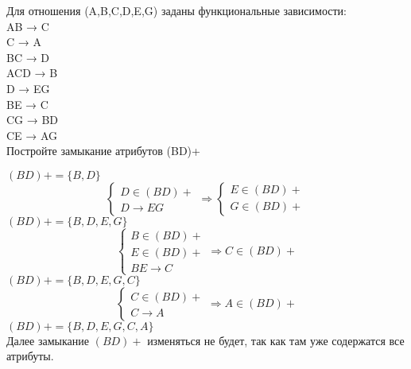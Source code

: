\begin{problem}
Для отношения (A,B,C,D,E,G) заданы функциональные зависимости: \\
AB → C \\
C → A \\
BC → D \\
ACD → B \\
D → EG \\
BE → C \\
CG → BD \\
CE → AG \\
Постройте замыкание атрибутов (BD)+
\end{problem}
\begin{solution}
    \((BD)+ = \{ B, D \}\)
    \[
    \begin{cases}
        D \in (BD)+ \\
        D \to EG
    \end{cases} \Longrightarrow
    \begin{cases}
        E \in (BD)+ \\
        G \in (BD)+
    \end{cases}
    \]
    \((BD)+ = \{ B, D, E, G \}\)
    \[
    \begin{cases}
        B \in (BD)+ \\
        E \in (BD)+ \\
        BE \to C
    \end{cases} \Longrightarrow
    C \in (BD)+
    \]
    \((BD)+ = \{ B, D, E, G, C \}\)
    \[
    \begin{cases}
        C \in (BD)+ \\
        C \to A
    \end{cases} \Longrightarrow
    A \in (BD)+
    \]
    \((BD)+ = \{ B, D, E, G, C, A \}\) \\
    Далее замыкание \( (BD)+ \) изменяться не будет, так как там уже содержатся все атрибуты.
\end{solution}